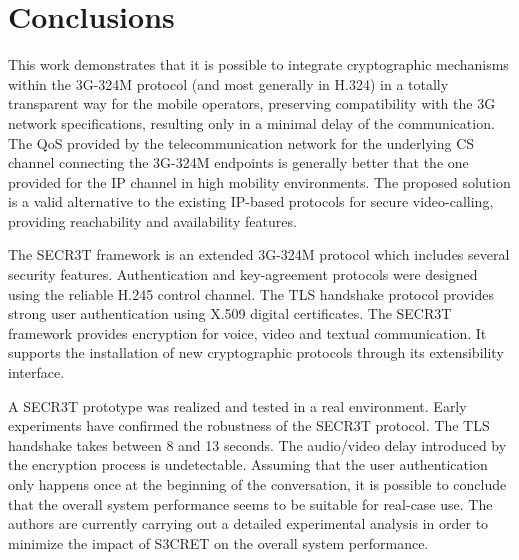 \documentclass[10pt, conference, compsocconf]{IEEEtran}
\begin{document}

\balance
\section{Conclusions}\label{par:conclusions}

This work demonstrates that it is possible to integrate cryptographic mechanisms within the 3G-324M protocol (and most generally in H.324) in a totally transparent way for the mobile operators, preserving compatibility with the 3G network specifications, resulting only in a minimal delay of the communication. The QoS provided by the telecommunication network for the underlying CS channel connecting the 3G-324M endpoints is generally better that the one provided for the IP channel in high mobility environments. The proposed solution is a valid alternative to the existing IP-based protocols for secure video-calling, providing reachability and availability features.

The SECR3T framework is an extended 3G-324M protocol which includes several security features. Authentication and key-agreement protocols were designed using the reliable H.245 control channel. The TLS handshake protocol provides strong user authentication using X.509 digital certificates. The SECR3T framework provides encryption for voice, video and textual communication. It supports the installation of new cryptographic protocols through its extensibility interface.

A SECR3T prototype was realized and tested in a real environment. Early experiments have confirmed the robustness of the SECR3T protocol. The TLS handshake takes between 8 and 13 seconds. The audio/video delay introduced by the encryption process is undetectable. Assuming that the user authentication only happens once at the beginning of the conversation, it is possible to conclude that the overall system performance seems to be suitable for real-case use. The authors are currently carrying out a detailed experimental analysis in order to minimize the impact of S3CRET on the overall system performance.




\end{document}
